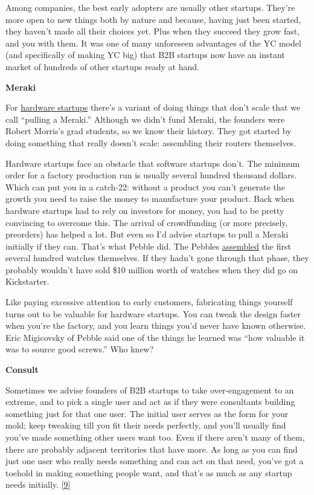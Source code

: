 Among companies, the best early adopters are usually other startups.
They're more open to new things both by nature and because, having just
been started, they haven't made all their choices yet. Plus when they
succeed they grow fast, and you with them. It was one of many unforeseen
advantages of the YC model (and specifically of making YC big) that B2B
startups now have an instant market of hundreds of other startups ready
at hand.

\textbf{Meraki}

For \href{hw.html}{hardware startups} there's a variant of doing things
that don't scale that we call ``pulling a Meraki.'' Although we didn't
fund Meraki, the founders were Robert Morris's grad students, so we know
their history. They got started by doing something that really doesn't
scale: assembling their routers themselves.

Hardware startups face an obstacle that software startups don't. The
minimum order for a factory production run is usually several hundred
thousand dollars. Which can put you in a catch-22: without a product you
can't generate the growth you need to raise the money to manufacture
your product. Back when hardware startups had to rely on investors for
money, you had to be pretty convincing to overcome this. The arrival of
crowdfunding (or more precisely, preorders) has helped a lot. But even
so I'd advise startups to pull a Meraki initially if they can. That's
what Pebble did. The Pebbles
\href{https://sep.turbifycdn.com/ty/cdn/paulgraham/eric.jpg?t=1730199416&}{assembled}
the first several hundred watches themselves. If they hadn't gone
through that phase, they probably wouldn't have sold \$10 million worth
of watches when they did go on Kickstarter.

Like paying excessive attention to early customers, fabricating things
yourself turns out to be valuable for hardware startups. You can tweak
the design faster when you're the factory, and you learn things you'd
never have known otherwise. Eric Migicovsky of Pebble said one of the
things he learned was ``how valuable it was to source good screws.'' Who
knew?

\textbf{Consult}

Sometimes we advise founders of B2B startups to take over-engagement to
an extreme, and to pick a single user and act as if they were
consultants building something just for that one user. The initial user
serves as the form for your mold; keep tweaking till you fit their needs
perfectly, and you'll usually find you've made something other users
want too. Even if there aren't many of them, there are probably adjacent
territories that have more. As long as you can find just one user who
really needs something and can act on that need, you've got a toehold in
making something people want, and that's as much as any startup needs
initially. {[}\hyperref[f9n]{9}{]}

